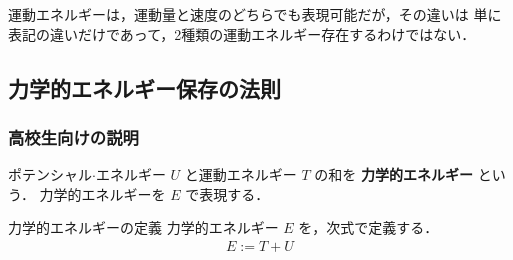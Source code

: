                運動エネルギーは，運動量と速度のどちらでも表現可能だが，その違いは
                単に表記の違いだけであって，2種類の運動エネルギー存在するわけではない．


        \subsection{力学的エネルギー保存の法則}
            \subsubsection{高校生向けの説明}
                ポテンシャル$\cdot$エネルギー $U$ と運動エネルギー $T$ の和を \textbf{力学的エネルギー} という．
                力学的エネルギーを $E$ で表現する．
                    \begin{myshadebox}{力学的エネルギーの定義}
                        力学的エネルギー $E$ を，次式で定義する．
                        \begin{align}\label{eq:KE}
                        E := T + U
                        \end{align}
                    \end{myshadebox}


